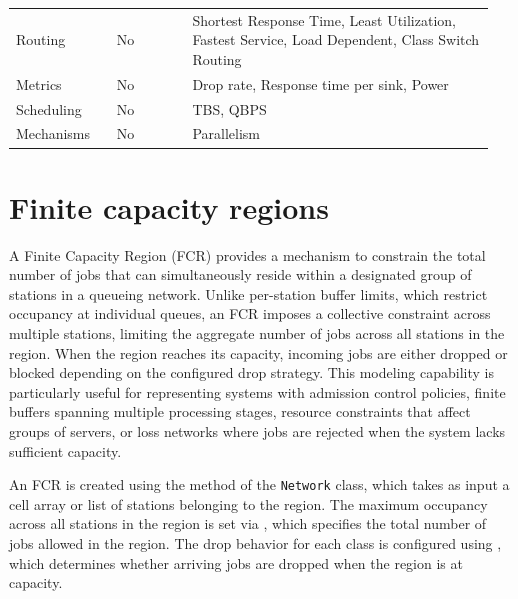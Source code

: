 {\begin{longtable}{|p{0.20\linewidth}|p{0.15\linewidth}|p{0.60\linewidth}|}
Routing & No & Shortest Response Time, Least Utilization, Fastest Service, Load Dependent, Class Switch Routing \\
Metrics & No & Drop rate, Response time per sink, Power\\
Scheduling & No & TBS, QBPS\\
Mechanisms & No & Parallelism \\
\hline
\end{longtable}
\label{TAB_JMT2LINE}
}

\section{Finite capacity regions}
A Finite Capacity Region (FCR) provides a mechanism to constrain the total number of jobs that can simultaneously reside within a designated group of stations in a queueing network. Unlike per-station buffer limits, which restrict occupancy at individual queues, an FCR imposes a collective constraint across multiple stations, limiting the aggregate number of jobs across all stations in the region. When the region reaches its capacity, incoming jobs are either dropped or blocked depending on the configured drop strategy. This modeling capability is particularly useful for representing systems with admission control policies, finite buffers spanning multiple processing stages, resource constraints that affect groups of servers, or loss networks where jobs are rejected when the system lacks sufficient capacity.

An FCR is created using the  method of the \texttt{Network} class, which takes as input a cell array or list of stations belonging to the region. The maximum occupancy across all stations in the region is set via , which specifies the total number of jobs allowed in the region. The drop behavior for each class is configured using , which determines whether arriving jobs are dropped when the region is at capacity.

